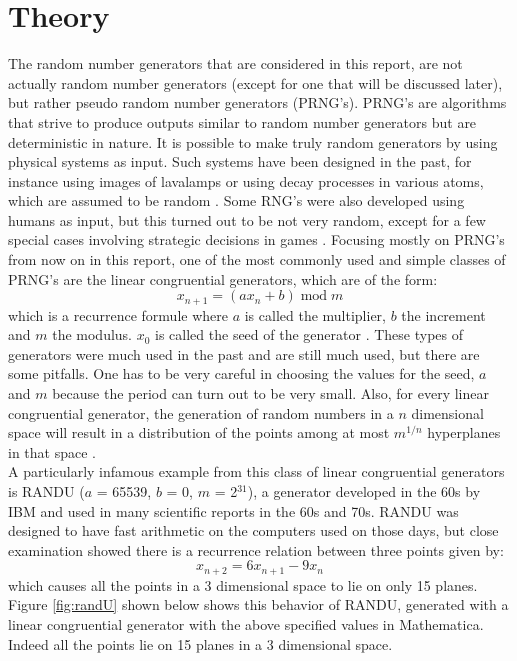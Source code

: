 \documentclass[10pt,a4paper]{article}
\begin{document}
\section{Theory}
The random number generators that are considered in this report, are not actually random number generators (except for one that will be discussed later), but rather pseudo random number generators (PRNG's). PRNG's are algorithms that strive to produce outputs similar to random number generators but are deterministic in nature. It is possible to make truly random generators by using physical systems as input. Such systems have been designed in the past, for instance using images of lavalamps \cite{lavalamp} or using decay processes in various atoms, which are assumed to be random \cite{decay}. Some RNG's were also developed using humans as input, but this turned out to be not very random, except for a few special cases involving strategic decisions in games \cite{human}.
\newline
\noindent Focusing mostly on PRNG's from now on in this report, one of the most commonly used and simple classes of PRNG's are the linear congruential generators, which are of the form:
\begin{equation}
x_{n+1} = (a x_{n} + b) \; \text{mod} \; m
\end{equation}
\noindent which is a recurrence formule where $a$ is called the multiplier, $b$ the increment and $m$ the modulus. $x_{0}$ is called the seed of the generator \cite{lcg}. These types of generators were much used in the past and are still much used, but there are some pitfalls. One has to be very careful in choosing the values for the seed, $a$ and $m$ because the period can turn out to be very small. Also, for every linear congruential generator, the generation of random numbers in a $n$ dimensional space will result in a distribution of the points among at most $m^{1/n}$ hyperplanes in that space \cite{marsaglia}.\\
\noindent A particularly infamous example from this class of linear congruential generators is RANDU ($a$ = 65539, $b$ = 0, $m$ = 2$^{31}$), a generator developed in the 60s by IBM and used in many scientific reports in the 60s and 70s. RANDU was designed to have fast arithmetic on the computers used on those days, but close examination showed there is a recurrence relation between three points given by:
\begin{equation}
x_{n+2} = 6 x_{n+1} - 9 x_{n} 
\end{equation}
\noindent which causes all the points in a 3 dimensional space to lie on only 15 planes. Figure \ref{fig:randU} shown below shows this behavior of RANDU, generated with a linear congruential generator with the above specified values in Mathematica. Indeed all the points lie on 15 planes in a 3 dimensional space.
\end{document}

